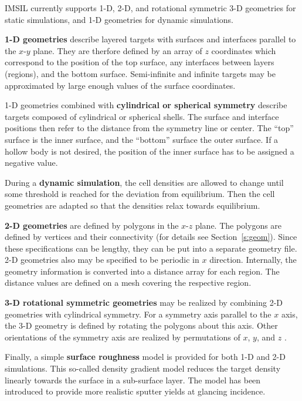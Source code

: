 IMSIL currently supports 1-D, 2-D, and rotational symmetric 3-D geometries for
static simulations, and 1-D geometries for dynamic simulations.

\textbf{1-D geometries} describe layered targets with surfaces and interfaces
parallel to the $x$-$y$ plane. They are therfore defined by an array of $z$
coordinates which correspond to the position of the top surface, any
interfaces between layers (regions), and the bottom surface. Semi-infinite and
infinite targets may be approximated by large enough values of the surface
coordinates. 

1-D geometries combined with \textbf{cylindrical or spherical symmetry} describe
targets composed of cylindrical or spherical shells. The surface and interface
positions then refer to the distance from the symmetry line or center. The
``top'' surface is the inner surface, and the ``bottom'' surface the outer
surface. If a hollow body is not desired, the position of the inner surface has
to be assigned a negative value.

During a \textbf{dynamic simulation}, the cell densities are allowed to change
until some threshold is reached for the deviation from equilibrium. Then the
cell geometries are adapted so that the densities relax towards equilibrium.

\textbf{2-D geometries} are defined by polygons in the $x$-$z$ plane. The
polygons are defined by vertices and their connectivity (for details see
Section~\ref{s:geom}). Since these specifications can be lengthy, they can be
put into a separate geometry file. 2-D geometries also may be specified to be
periodic in $x$ direction. Internally, the geometry information is converted
into a distance array for each region. The distance values are defined on a mesh
covering the respective region.

\textbf{3-D rotational symmetric geometries} may be realized by combining 2-D
geometries with cylindrical symmetry. For a symmetry axis parallel to the $x$
axis, the 3-D geometry is defined by rotating the polygons about this axis.
Other orientations of the symmetry axis are realized by permutations of $x$,
$y$, and $z$ \cite{bradley_second_2021}.

Finally, a simple \textbf{surface roughness} model is provided for both 1-D and
2-D simulations. This so-called density gradient model
\cite{lindsey_simple_2017} reduces the target density linearly towards the
surface in a sub-surface layer. The model has been introduced to provide more
realistic sputter yields at glancing incidence. 


